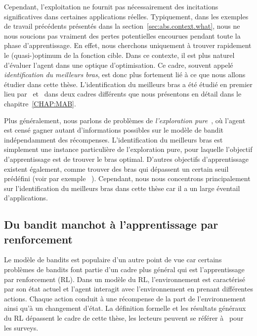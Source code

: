 Cependant, l'exploitation ne fournit pas nécessairement des incitations significatives dans certaines applications réelles. Typiquement, dans les exemples de travail précédents présentés dans la section~\ref{sec:abs.context.what}, nous ne nous soucions pas vraiment des pertes potentielles encourues pendant toute la phase d'apprentissage. En effet, nous cherchons uniquement à trouver rapidement le (quasi-)optimum de la fonction cible. Dans ce contexte, il est plus naturel d'évaluer l'agent dans une optique d'optimisation. Ce cadre, souvent appelé \emph{identification du meilleurs bras}, est donc plus fortement lié à ce que nous allons étudier dans cette thèse. L'identification du meilleurs bras a été étudié en premier lieu par~\cite{even-dar2003confidence} et~\cite{bubeck2009pure} dans deux cadres différents que nous présentons en détail dans le chapitre~\ref{CHAP:MAB}.

Plus généralement, nous parlons de problèmes de \emph{l'exploration pure}~\citep{bubeck2011pure}, où l'agent est censé gagner autant d'informations possibles sur le modèle de bandit indépendamment des récompenses. L'identification du meilleurs bras est simplement une instance particulière de l'exploration pure, pour laquelle l'objectif d'apprentissage est de trouver le bras optimal. D'autres objectifs d'apprentissage existent également, comme trouver des bras qui dépassent un certain seuil prédéfini (voir par exemple ~\citealt{locatelli2016thresholding}). Cependant, nous nous concentrons principalement sur l'identification du meilleurs bras dans cette thèse car il a un large éventail d'applications.

\subsection{Du bandit manchot \`a l'apprentissage par renforcement}\label{sec:abs.context.rl}

Le modèle de bandits est populaire d'un autre point de vue car certains problèmes de bandits font partie d'un cadre plus général qui est l'apprentissage par renforcement (RL). Dans un modèle du RL, l'environnement est caractérisé par son état actuel et l'agent interagit avec l'environnement en prenant différentes actions. Chaque action conduit à une récompense de la part de l'environnement ainsi qu'à un changement d'état. La définition formelle et les résultats généraux du RL dépassent le cadre de cette thèse, les lecteurs peuvent se référer à~\cite{sutton1998,bertsekas2011approximate} pour les surveys. 

